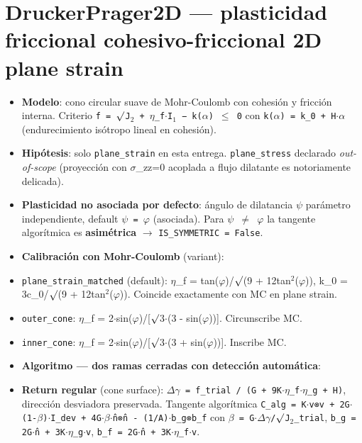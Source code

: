 \documentclass[11pt,letterpaper,oneside]{report}
\begin{document}
\section{DruckerPrager2D --- plasticidad friccional cohesivo-friccional 2D plane strain}

\begin{itemize}
  \item \textbf{Modelo}: cono circular suave de Mohr-Coulomb con cohesión y fricción interna. Criterio \texttt{f = \ensuremath{\surd}J\ensuremath{_{2}} + \ensuremath{\eta}\_f\ensuremath{\cdot}I\ensuremath{_{1}} − k(\ensuremath{\alpha}) \ensuremath{\le} 0} con \texttt{k(\ensuremath{\alpha}) = k\_0 + H\ensuremath{\cdot}\ensuremath{\alpha}} (endurecimiento isótropo lineal en cohesión).
  \item \textbf{Hipótesis}: solo \texttt{plane\_strain} en esta entrega. \texttt{plane\_stress} declarado \textit{out-of-scope} (proyección con \ensuremath{\sigma}\_zz=0 acoplada a flujo dilatante es notoriamente delicada).
  \item \textbf{Plasticidad no asociada por defecto}: ángulo de dilatancia \texttt{\ensuremath{\psi}} parámetro independiente, default \texttt{\ensuremath{\psi} = \ensuremath{\varphi}} (asociada). Para \texttt{\ensuremath{\psi} \ensuremath{\neq} \ensuremath{\varphi}} la tangente algorítmica es \textbf{asimétrica} \ensuremath{\to} \texttt{IS\_SYMMETRIC = False}.
  \item \textbf{Calibración con Mohr-Coulomb} (variant):
  \item \texttt{plane\_strain\_matched} (default): \ensuremath{\eta}\_f = tan(\ensuremath{\varphi})/\ensuremath{\surd}(9 + 12tan\ensuremath{^{2}}(\ensuremath{\varphi})), k\_0 = 3c\_0/\ensuremath{\surd}(9 + 12tan\ensuremath{^{2}}(\ensuremath{\varphi})). Coincide exactamente con MC en plane strain.
  \item \texttt{outer\_cone}: \ensuremath{\eta}\_f = 2\ensuremath{\cdot}sin(\ensuremath{\varphi})/[\ensuremath{\surd}3\ensuremath{\cdot}(3 - sin(\ensuremath{\varphi}))]. Circunscribe MC.
  \item \texttt{inner\_cone}: \ensuremath{\eta}\_f = 2\ensuremath{\cdot}sin(\ensuremath{\varphi})/[\ensuremath{\surd}3\ensuremath{\cdot}(3 + sin(\ensuremath{\varphi}))]. Inscribe MC.
  \item \textbf{Algoritmo --- dos ramas cerradas con detección automática}:
  \item \textbf{Return regular} (cone surface): \texttt{\ensuremath{\Delta}\ensuremath{\gamma} = f\_trial / (G + 9K\ensuremath{\cdot}\ensuremath{\eta}\_f\ensuremath{\cdot}\ensuremath{\eta}\_g + H)}, dirección desviadora preservada. Tangente algorítmica \texttt{C\_alg = K\ensuremath{\cdot}v⊗v + 2G\ensuremath{\cdot}(1-\ensuremath{\beta})\ensuremath{\cdot}I\_dev + 4G\ensuremath{\cdot}\ensuremath{\beta}\ensuremath{\cdot}n̂⊗n̂ - (1/A)\ensuremath{\cdot}b\_g⊗b\_f} con \texttt{\ensuremath{\beta} = G\ensuremath{\cdot}\ensuremath{\Delta}\ensuremath{\gamma}/\ensuremath{\surd}J\ensuremath{_{2}}\_trial}, \texttt{b\_g = 2G\ensuremath{\cdot}n̂ + 3K\ensuremath{\cdot}\ensuremath{\eta}\_g\ensuremath{\cdot}v}, \texttt{b\_f = 2G\ensuremath{\cdot}n̂ + 3K\ensuremath{\cdot}\ensuremath{\eta}\_f\ensuremath{\cdot}v}.

\end{itemize}
\end{document}
